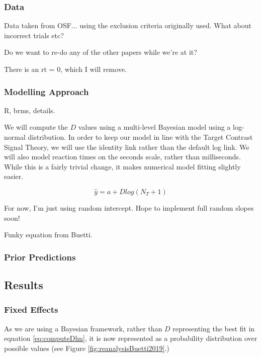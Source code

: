 \subsubsection{Data}

Data taken from OSF... using the exclusion criteria originally used. What about incorrect trials etc? 

Do we want to re-do any of the other papers while we're at it?

There is an rt = 0, which I will remove. 

\subsubsection{Modelling Approach}

R, brms, details.

We will compute the $D$ values using a multi-level Bayesian model using a log-normal distribution. In order to keep our model in line with the Target Contrast Signal Theory, we will use the identity link rather than the default log link. We will also model reaction times on the seconds scale, rather than milliseconds. While this is a fairly trivial change, it makes numerical model fitting slightly easier. 

\begin{equation}
\hat{y} = a + Dlog(N_T + 1)
\label{eq:computeDlm}
\end{equation}

For now, I'm just using random intercept. Hope to implement full random slopes soon!



Funky equation from Buetti. 

\subsubsection{Prior Predictions}

\subsection{Results}

\subsubsection{Fixed Effects}

As we are using a Bayesian framework, rather than $D$ representing the best fit in equation \ref{eq:computeDlm}, it is now represented as a probability distribution over possible values (see Figure \ref{fig:reanalysisBuetti2019}.)


